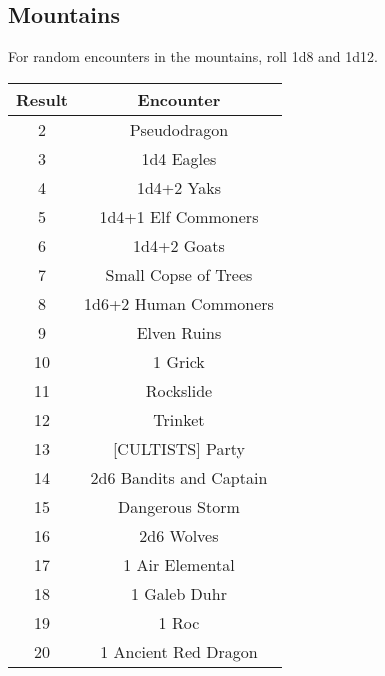 \subsection{Mountains}

For random encounters in the mountains, roll 1d8 and 1d12.

\begin{tabular}{|c|c|}

\hline

\textbf{Result} & \textbf{Encounter}\\

\hline

2 & Pseudodragon\\

3 & 1d4 Eagles\\

4 & 1d4+2 Yaks\\

5 & 1d4+1 Elf Commoners\\

6 & 1d4+2 Goats\\

7 & Small Copse of Trees\\

8 & 1d6+2 Human Commoners\\

9 & Elven Ruins\\

10 & 1 Grick\\

11 & Rockslide\\

12 & Trinket\\

13 & [CULTISTS] Party\\

14 & 2d6 Bandits and Captain\\

15 & Dangerous Storm\\

16 & 2d6 Wolves\\

17 & 1 Air Elemental\\

18 & 1 Galeb Duhr\\

19 & 1 Roc\\

20 & 1 Ancient Red Dragon\\

\hline

\end{tabular}

